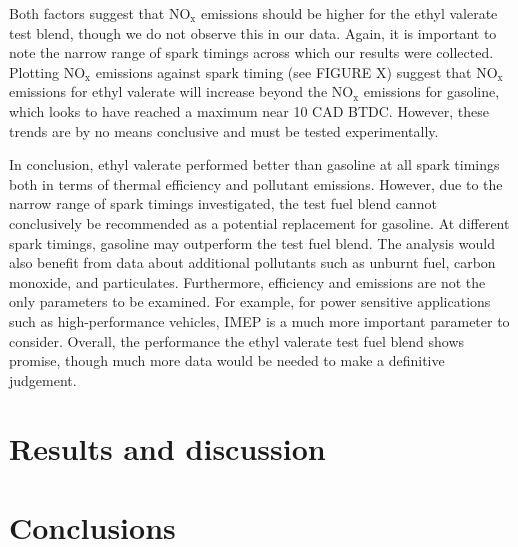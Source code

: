 \documentclass[11pt]{article}
\begin{document}
Both factors suggest that $\text{NO}_{\text{x}}$ emissions should be higher for the ethyl valerate test blend, though we do not observe this in our data. Again, it is important to note the narrow range of spark timings across which our results were collected. Plotting $\text{NO}_{\text{x}}$ emissions against spark timing (see FIGURE X) suggest that $\text{NO}_{\text{x}}$ emissions for ethyl valerate will increase beyond the $\text{NO}_{\text{x}}$ emissions for gasoline, which looks to have reached a maximum near 10 CAD BTDC. However, these trends are by no means conclusive and must be tested experimentally.

In conclusion, ethyl valerate performed better than gasoline at all spark timings both in terms of thermal efficiency and pollutant emissions. However, due to the narrow range of spark timings investigated, the test fuel blend cannot conclusively be recommended as a potential replacement for gasoline. At different spark timings, gasoline may outperform the test fuel blend. The analysis would also benefit from data about additional pollutants such as unburnt fuel, carbon monoxide, and particulates. Furthermore, efficiency and emissions are not the only parameters to be examined. For example, for power sensitive applications such as high-performance vehicles, IMEP is a much more important parameter to consider. Overall, the performance the ethyl valerate test fuel blend shows promise, though much more data would be needed to make a definitive judgement. 

\section*{Results and discussion}
\section*{Conclusions}
\begin{thebibliography}{00}

\end{thebibliography}
\end{document}
